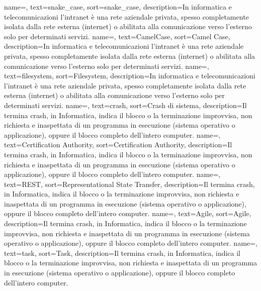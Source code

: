 {
	name=,
	text=snake\_case,
	sort=snake\_case,
	description={In informatica e telecomunicazioni l'intranet è una rete aziendale privata, spesso completamente isolata dalla rete esterna (internet) o abilitata alla comunicazione verso l'esterno solo per determinati servizi.}
}
{
	name=,
	text=CamelCase,
	sort=Camel Case,
	description={In informatica e telecomunicazioni l'intranet è una rete aziendale privata, spesso completamente isolata dalla rete esterna (internet) o abilitata alla comunicazione verso l'esterno solo per determinati servizi.}
}
{
	name=,
	text=filesystem,
	sort=Filesystem,
	description={In informatica e telecomunicazioni l'intranet è una rete aziendale privata, spesso completamente isolata dalla rete esterna (internet) o abilitata alla comunicazione verso l'esterno solo per determinati servizi.}
}
{
	name=,
	text=crash,
	sort=Crash di sistema,
	description={Il termina crash, in Informatica, indica il blocco o la terminazione improvvisa, non richiesta e inaspettata di un programma in esecuzione (sistema operativo o applicazione), oppure il blocco completo dell'intero computer. }
}
{
	name=,
	text=Certification Authority,
	sort=Certification Authority,
	description={Il termina crash, in Informatica, indica il blocco o la terminazione improvvisa, non richiesta e inaspettata di un programma in esecuzione (sistema operativo o applicazione), oppure il blocco completo dell'intero computer. }
}
{
	name=,
	text=REST,
	sort=Representational State Transfer,
	description={Il termina crash, in Informatica, indica il blocco o la terminazione improvvisa, non richiesta e inaspettata di un programma in esecuzione (sistema operativo o applicazione), oppure il blocco completo dell'intero computer. }
}
{
	name=,
	text=Agile,
	sort=Agile,
	description={Il termina crash, in Informatica, indica il blocco o la terminazione improvvisa, non richiesta e inaspettata di un programma in esecuzione (sistema operativo o applicazione), oppure il blocco completo dell'intero computer. }
}
{
	name=,
	text=task,
	sort=Task,
	description={Il termina crash, in Informatica, indica il blocco o la terminazione improvvisa, non richiesta e inaspettata di un programma in esecuzione (sistema operativo o applicazione), oppure il blocco completo dell'intero computer. }
}
